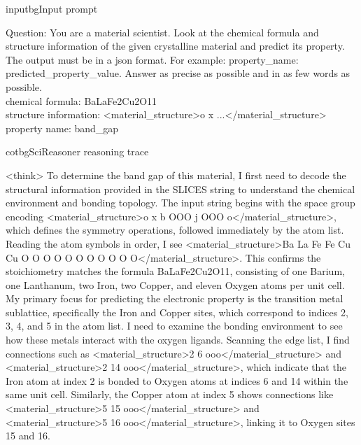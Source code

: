 \begin{appendices}
\begin{fullcotsection}{inputbg}{Input prompt}
\begin{cotverbatim}
Question:
You are a material scientist. Look at the chemical formula and structure information of the given crystalline material and predict its property. The output must be in a json format. For example: {property_name: predicted_property_value}. Answer as precise as possible and in as few words as possible. \\
chemical formula: BaLaFe2Cu2O11 \\
structure information: <material_structure>o x ...</material_structure> \\
property name: band_gap
\end{cotverbatim}
\end{fullcotsection}

\vspace{0.6em}

\begin{fullcotsection}{cotbg}{SciReasoner reasoning trace}
\begin{cotverbatim}
<think>
To determine the band gap of this material, I first need to decode the structural information provided in the SLICES string to understand the chemical environment and bonding topology. The input string begins with the space group encoding <material_structure>o x b OOO j OOO o</material_structure>, which defines the symmetry operations, followed immediately by the atom list. Reading the atom symbols in order, I see <material_structure>Ba La Fe Fe Cu Cu O O O O O O O O O O O</material_structure>. This confirms the stoichiometry matches the formula BaLaFe2Cu2O11, consisting of one Barium, one Lanthanum, two Iron, two Copper, and eleven Oxygen atoms per unit cell. \\
My primary focus for predicting the electronic property is the transition metal sublattice, specifically the Iron and Copper sites, which correspond to indices 2, 3, 4, and 5 in the atom list. I need to examine the bonding environment to see how these metals interact with the oxygen ligands. Scanning the edge list, I find connections such as <material_structure>2 6 ooo</material_structure> and <material_structure>2 14 ooo</material_structure>, which indicate that the Iron atom at index 2 is bonded to Oxygen atoms at indices 6 and 14 within the same unit cell. Similarly, the Copper atom at index 5 shows connections like <material_structure>5 15 ooo</material_structure> and <material_structure>5 16 ooo</material_structure>, linking it to Oxygen sites 15 and 16. \\

\end{cotverbatim}
\end{fullcotsection}
\end{appendices}
